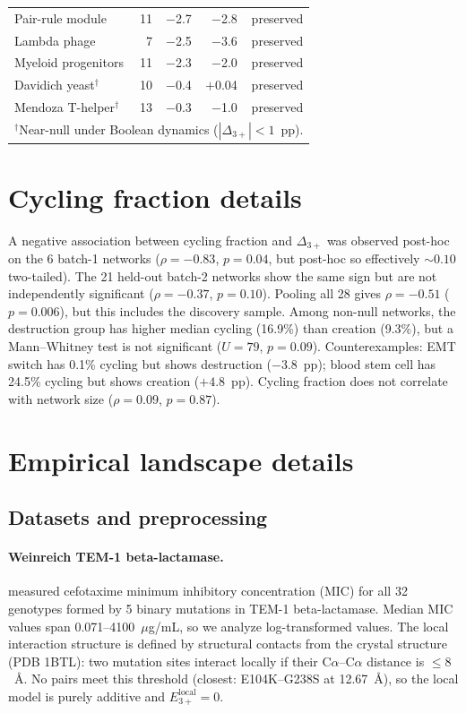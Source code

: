 \documentclass[10pt]{article}
\begin{document}
\begin{table}[h]
\begin{tabular}{lrrrr}
Pair-rule module & 11 & $-$2.7 & $-$2.8 & preserved \\
Lambda phage & 7 & $-$2.5 & $-$3.6 & preserved \\
Myeloid progenitors & 11 & $-$2.3 & $-$2.0 & preserved \\
Davidich yeast$^\dagger$ & 10 & $-$0.4 & $+$0.04 & preserved \\
Mendoza T-helper$^\dagger$ & 13 & $-$0.3 & $-$1.0 & preserved \\
\bottomrule
\multicolumn{5}{l}{\footnotesize $^\dagger$Near-null under Boolean dynamics ($|\Delta_{3+}| < 1$~pp).} \\
\end{tabular}
\end{table}


\section{Cycling fraction details}
\label{supp:cycling}

A negative association between cycling fraction and $\Delta_{3+}$
was observed post-hoc on the 6 batch-1 networks ($\rho = -0.83$,
$p = 0.04$, but post-hoc so effectively $\sim 0.10$ two-tailed).
The 21 held-out batch-2 networks show the same sign but are not
independently significant ($\rho = -0.37$, $p = 0.10$). Pooling
all 28 gives $\rho = -0.51$ ($p = 0.006$), but this includes the
discovery sample. Among non-null networks, the destruction group
has higher median cycling (16.9\%) than creation (9.3\%), but a
Mann--Whitney test is not significant ($U = 79$, $p = 0.09$).
Counterexamples: EMT switch has 0.1\% cycling but shows destruction
($-3.8$~pp); blood stem cell has 24.5\% cycling but shows creation
($+4.8$~pp). Cycling fraction does not correlate with network size
($\rho = 0.09$, $p = 0.87$).


\section{Empirical landscape details}
\label{supp:empirical}

\subsection*{Datasets and preprocessing}

\paragraph{Weinreich TEM-1 beta-lactamase.}
\citet{weinreich2006darwinian} measured cefotaxime minimum
inhibitory concentration (MIC) for all 32 genotypes formed by 5
binary mutations in TEM-1 beta-lactamase. Median MIC values span
0.071--4100~$\mu$g/mL, so we analyze log-transformed values. The
local interaction structure is defined
by structural contacts from the crystal structure (PDB 1BTL): two
mutation sites interact locally if their C$\alpha$--C$\alpha$
distance is $\leq 8$~\AA. No pairs meet this threshold (closest:
E104K--G238S at 12.67~\AA), so the local model is purely additive
and $E_{3+}^{\mathrm{local}} = 0$.
\end{document}
